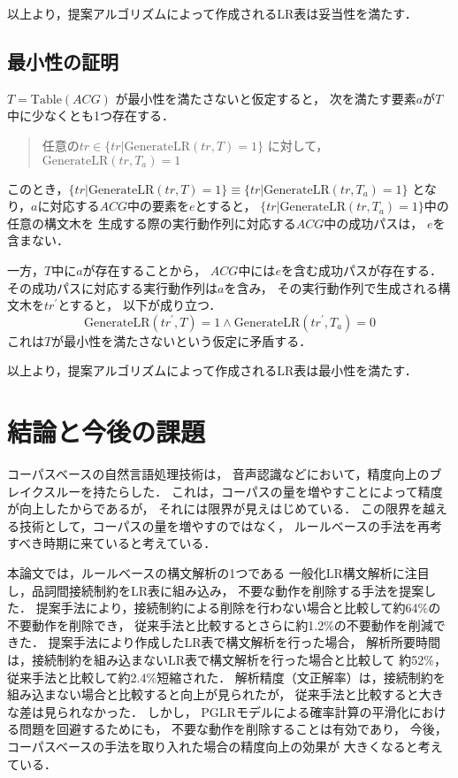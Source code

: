 \documentclass[japanese]{jnlp_1.4}
\begin{document}
以上より，提案アルゴリズムによって作成されるLR表は妥当性を満たす．


\subsection{最小性の証明}

$T=\mathrm{Table}(\mathit{ACG})$ が最小性を満たさないと仮定すると，
次を満たす要素$a$が$T$中に少なくとも1つ存在する．
\begin{quotation}
  任意の$\mathit{tr}\in\{\mathit{tr}|\mathrm{GenerateLR}(\mathit{tr},T)=1\}$
  に対して，$\mathrm{GenerateLR}(\mathit{tr},T_a)=1$
\end{quotation}

このとき，$\{\mathit{tr}|\mathrm{GenerateLR}(\mathit{tr},T)=1\}\equiv\{\mathit{tr}|\mathrm{GenerateLR}(\mathit{tr},T_a)=1\}$
となり，$a$に対応する$\mathit{ACG}$中の要素を$e$とすると，
$\{\mathit{tr}|\mathrm{GenerateLR}(\mathit{tr},T_a)=1\}$中の任意の構文木を
生成する際の実行動作列に対応する$\mathit{ACG}$中の成功パスは，
$e$を含まない．

一方，$T$中に$a$が存在することから，
$\mathit{ACG}$中には$e$を含む成功パスが存在する．
その成功パスに対応する実行動作列は$a$を含み，
その実行動作列で生成される構文木を$\mathit{tr}^\prime$とすると，
以下が成り立つ．
\[
  \mathrm{GenerateLR}(\mathit{tr}^\prime, T) = 1 \wedge \mathrm{GenerateLR}(\mathit{tr}^\prime, T_a) = 0
\]
これは$T$が最小性を満たさないという仮定に矛盾する．

以上より，提案アルゴリズムによって作成されるLR表は最小性を満たす．



\section{結論と今後の課題}
\label{sec:conclusion}

コーパスベースの自然言語処理技術は，
音声認識などにおいて，精度向上のブレイクスルーを持たらした．
これは，コーパスの量を増やすことによって精度が向上したからであるが，
それには限界が見えはじめている．
この限界を越える技術として，コーパスの量を増やすのではなく，
ルールベースの手法を再考すべき時期に来ていると考えている．

本論文では，ルールベースの構文解析の1つである
一般化LR構文解析に注目し，品詞間接続制約をLR表に組み込み，
不要な動作を削除する手法を提案した．
提案手法により，接続制約による削除を行わない場合と比較して約64\%の
不要動作を削除でき，
従来手法と比較するとさらに約1.2\%の不要動作を削減できた．
提案手法により作成したLR表で構文解析を行った場合，
解析所要時間は，接続制約を組み込まないLR表で構文解析を行った場合と比較して
約52\%，従来手法と比較して約2.4\%短縮された．
解析精度（文正解率）は，接続制約を組み込まない場合と比較すると向上が見られたが，
従来手法と比較すると大きな差は見られなかった．
しかし，
PGLRモデルによる確率計算の平滑化における問題を回避するためにも，
不要な動作を削除することは有効であり，
今後，コーパスベースの手法を取り入れた場合の精度向上の効果が
大きくなると考えている．
\end{document}

